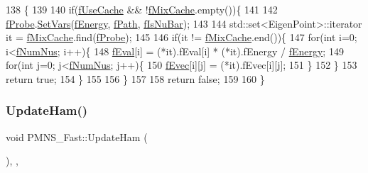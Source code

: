 \begin{DoxyCode}
138 \{
139 
140   \textcolor{keywordflow}{if}(\hyperlink{classOscProb_1_1PMNS__Base_ad28c12ef897b5555eda509ea55c99107}{fUseCache} && !\hyperlink{classOscProb_1_1PMNS__Base_a8159424f20197a3a7145fe3bf2c11176}{fMixCache}.empty())\{
141 
142     \hyperlink{classOscProb_1_1PMNS__Base_ab1fe4800ee3ae48df4fc942dce00e0d3}{fProbe}.\hyperlink{structOscProb_1_1EigenPoint_a2e293e0820715950ec8fb370e8cc9477}{SetVars}(\hyperlink{classOscProb_1_1PMNS__Base_a2800af6d436972f3e900867790c046b0}{fEnergy}, \hyperlink{classOscProb_1_1PMNS__Base_a849437aa8891fe042e86886ce8f81c6e}{fPath}, \hyperlink{classOscProb_1_1PMNS__Base_a0ebaeaefab36a3ff381c6293faedfdd6}{fIsNuBar});
143     
144     std::set<EigenPoint>::iterator it = \hyperlink{classOscProb_1_1PMNS__Base_a8159424f20197a3a7145fe3bf2c11176}{fMixCache}.find(\hyperlink{classOscProb_1_1PMNS__Base_ab1fe4800ee3ae48df4fc942dce00e0d3}{fProbe});
145 
146     \textcolor{keywordflow}{if}(it != \hyperlink{classOscProb_1_1PMNS__Base_a8159424f20197a3a7145fe3bf2c11176}{fMixCache}.end())\{
147       \textcolor{keywordflow}{for}(\textcolor{keywordtype}{int} i=0; i<\hyperlink{classOscProb_1_1PMNS__Base_a24bb74bed63569dfe88b18fa6a08060e}{fNumNus}; i++)\{
148         \hyperlink{classOscProb_1_1PMNS__Base_a6319c34d7decbb9d7d6da279c06e8c2d}{fEval}[i] = (*it).fEval[i] * (*it).fEnergy / \hyperlink{classOscProb_1_1PMNS__Base_a2800af6d436972f3e900867790c046b0}{fEnergy};
149         \textcolor{keywordflow}{for}(\textcolor{keywordtype}{int} j=0; j<\hyperlink{classOscProb_1_1PMNS__Base_a24bb74bed63569dfe88b18fa6a08060e}{fNumNus}; j++)\{
150           \hyperlink{classOscProb_1_1PMNS__Base_a87be137356c5f27ab83cab5e1298ef8f}{fEvec}[i][j] = (*it).fEvec[i][j];
151         \}
152       \}
153       \textcolor{keywordflow}{return} \textcolor{keyword}{true};
154     \}
155 
156   \}
157   
158   \textcolor{keywordflow}{return} \textcolor{keyword}{false};
159 
160 \}
\end{DoxyCode}
\mbox{\label{classOscProb_1_1PMNS__Fast_a16248082308f9d2c332ebf1be0aa90c3}} 
\subsubsection{\texorpdfstring{Update\+Ham()}{UpdateHam()}}
{\footnotesize\ttfamily void P\+M\+N\+S\+\_\+\+Fast\+::\+Update\+Ham (\begin{DoxyParamCaption}{ }\end{DoxyParamCaption})\hspace{0.3cm}{\ttfamily [protected]}, {\ttfamily [virtual]}, {\ttfamily [inherited]}}

